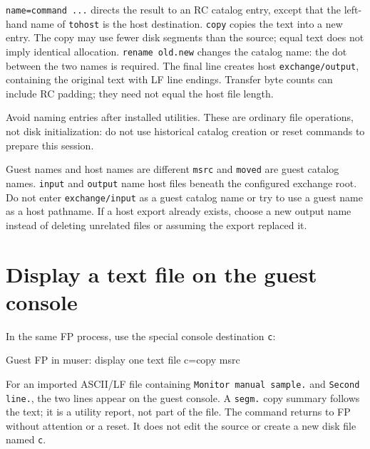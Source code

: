 \passthrough{\lstinline!name=command ...!} directs the result to an RC catalog entry, except that the left-hand name of \passthrough{\lstinline!tohost!} is the host destination. \passthrough{\lstinline!copy!} copies the text into a new entry. The copy may use fewer disk segments than the source; equal text does not imply identical allocation. \passthrough{\lstinline!rename old.new!} changes the catalog name: the dot between the two names is required. The final line creates host \passthrough{\lstinline!exchange/output!}, containing the original text with LF line endings. Transfer byte counts can include RC padding; they need not equal the host file length.

Avoid naming entries after installed utilities. These are ordinary file operations, not disk initialization: do not use historical catalog creation or reset commands to prepare this session.

\begin{operationnote}{Guest names and host names are different}
\passthrough{\lstinline!msrc!} and \passthrough{\lstinline!moved!} are
guest catalog names. \passthrough{\lstinline!input!} and
\passthrough{\lstinline!output!} name host files beneath the configured
exchange root. Do not enter \passthrough{\lstinline!exchange/input!} as a
guest catalog name or try to use a guest name as a host pathname. If a host
export already exists, choose a new output name instead of deleting unrelated
files or assuming the export replaced it.
\end{operationnote}

\section{Display a text file on the guest console}\label{display-a-text-file-on-the-guest-console}

In the same FP process, use the special console destination \passthrough{\lstinline!c!}:

\begin{commandexample}{Guest FP in muser: display one text file}
c=copy msrc
\end{commandexample}

For an imported ASCII/LF file containing \passthrough{\lstinline!Monitor manual sample.!} and \passthrough{\lstinline!Second line.!}, the two lines appear on the guest console. A \passthrough{\lstinline!segm.!} copy summary follows the text; it is a utility report, not part of the file. The command returns to FP without attention or a reset. It does not edit the source or create a new disk file named \passthrough{\lstinline!c!}.

